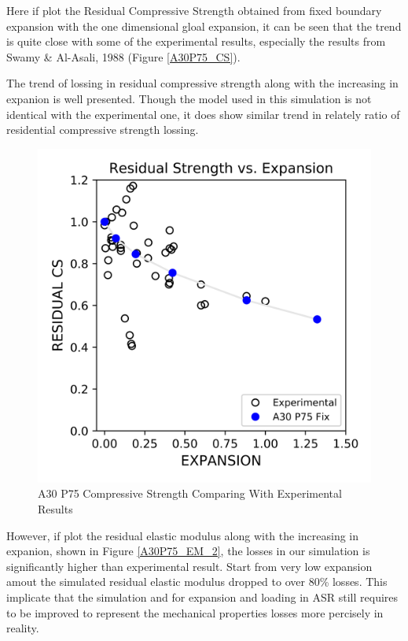 Here if plot the Residual Compressive Strength obtained from fixed boundary expansion with the one dimensional gloal expansion, it can be seen that the trend is quite close with some of the experimental results, especially the results from Swamy \& Al-Asali, 1988 (Figure \ref{A30P75_CS})\cite{Swamy}.

The trend of lossing in residual compressive strength along with the increasing in expanion is well presented. Though the model used in this simulation is not identical with the experimental one, it does show similar trend in relately ratio of residential compressive strength lossing.

\begin{figure}[ht!]
\centering
\includegraphics[width=.8\linewidth]{Files/CS_plot/ASRCS1.png}
  \caption{A30 P75 Compressive Strength Comparing With Experimental Results}
  \label{A30P75_CS_2}
\end{figure}

However, if plot the residual elastic modulus along with the increasing in expanion, shown in Figure \ref{A30P75_EM_2}, the losses in our simulation is significantly higher than experimental result. Start from very low expansion amout the simulated residual elastic modulus dropped to over 80\% losses. This implicate that the simulation and for expansion and loading in ASR still requires to be improved to represent the mechanical properties losses more percisely in reality.

